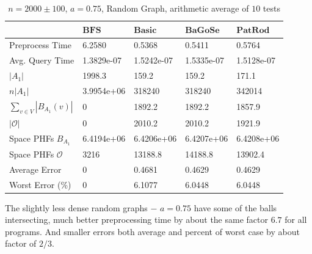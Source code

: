\documentclass[shortabstract, lic, english]{iithesis}
\theoremstyle{definition} \newtheorem{definition}{Definition}[chapter]
\theoremstyle{plain} \newtheorem{remark}[definition]{Observation}
\theoremstyle{plain} \newtheorem{theorem}[definition]{Theorem}
\theoremstyle{plain} \newtheorem{lemma}[definition]{Lemma}
\theoremstyle{plain} \newtheorem{conjecture}[definition]{Conjecture}
\begin{document}
\begin{table}[H] \label{test:random.a0.75}
    \centering
    \begin{tabular}{ |p{3cm}||p{2cm}|p{2cm}|p{2cm}|p{2cm}|  } 
        \hline
        & $\mathbf{BFS}$ & $\mathbf{Basic}$ & $\mathbf{BaGoSe}$ & $\mathbf{PatRod}$ \\
        \hline
        \hline
        Preprocess Time                 & 6.2580     & 0.5368     & 0.5411      & 0.5764     \\
        \hline
        Avg. Query Time                 & 1.3829e-07 & 1.5242e-07 & 1.5335e-07  & 1.5128e-07 \\
        \hline
        $|A_1|$                         & 1998.3     & 159.2      &  159.2      & 171.1      \\
        \hline
        $n |A_1|$                       & 3.9954e+06 & 318240     &  318240     & 342014     \\
        \hline
        $\sum_{v \in V} |B_{A_1}(v)| $  & 0          & 1892.2     & 1892.2      & 1857.9     \\
        \hline
        $|\mathcal{O}|$                 & 0          & 2010.2     & 2010.2      & 1921.9     \\
        \hline
        Space PHFs $B_{A_1}$            & 6.4194e+06 & 6.4206e+06 & 6.4207e+06  & 6.4208e+06 \\
        \hline
        Space PHFs $\mathcal{O}$        & 3216       & 13188.8    & 14188.8     & 13902.4    \\
        \hline
        Average Error                   & 0          & 0.4681     & 0.4629      & 0.4629     \\
        \hline
        Worst Error (\%)                & 0          & 6.1077     & 6.0448      & 6.0448     \\
        \hline

    \end{tabular}
    \caption{$n = 2000 \pm 100$, $a = 0.75$, Random Graph, arithmetic average of $10$ tests}
\end{table}

The slightly less dense random graphs $-$ $a=0.75$ have some of the balls intersecting, much better preprocessing time by about the same factor $6.7$ for all programs.
And smaller errors both average and percent of worst case by about factor of $2/3$.
\end{document}
